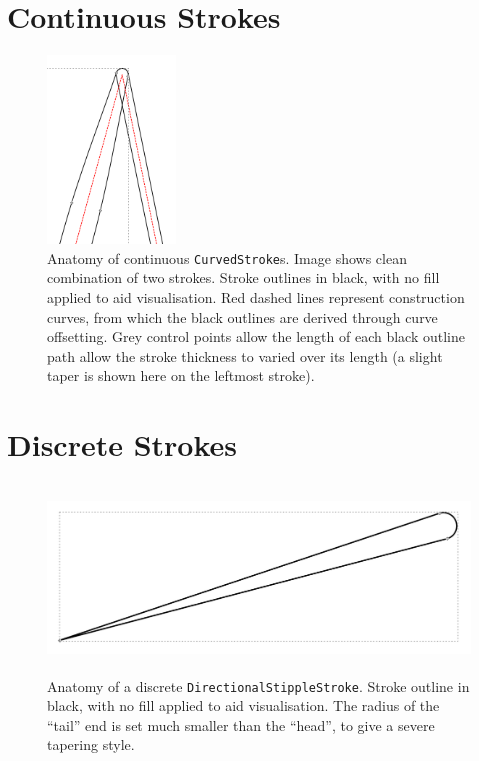 \FloatBarrier
\section{Continuous Strokes}

\begin{figure}[h!]
	\centering
	\includegraphics[height=5cm]{images/stroke_construction.png}
	\caption{Anatomy of continuous \texttt{CurvedStroke}s. Image shows clean combination of two strokes. Stroke outlines in black, with no fill applied to aid visualisation. Red dashed lines represent construction curves, from which the black outlines are derived through curve offsetting. Grey control points allow the length of each black outline path allow the stroke thickness to varied over its length (a slight taper is shown here on the leftmost stroke).}\label{stroke_construction}
\end{figure}

\FloatBarrier
\section{Discrete Strokes}

\begin{figure}[h!]
	\centering
	\includegraphics[height=5cm]{images/stipple_construction.png}
	\caption{Anatomy of a discrete \texttt{DirectionalStippleStroke}. Stroke outline in black, with no fill applied to aid visualisation. The radius of the ``tail'' end is set much smaller than the ``head'', to give a severe tapering style.}\label{stroke_construction}
\end{figure}